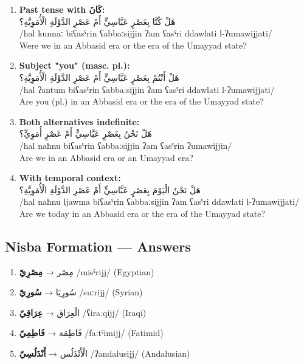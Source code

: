 \documentclass[letterpaper,12pt]{article}
\begin{document}
\begin{enumerate}
\item \textbf{Past tense with \textarabic{كَانَ}:}\\
\textarabic{هَلْ كُنَّا بِعَصْرٍ عَبَّاسِيٍّ أَمْ عَصْرِ الدَّوْلَةِ الْأُمَوِيَّةِ؟}\\
/hal kunnaː biʕasˤrin ʕabbaːsijjin ʔam ʕasˤri ddawlati l-ʔumawijjati/\\
Were we in an Abbasid era or the era of the Umayyad state?

\item \textbf{Subject "you" (masc. pl.):}\\
\textarabic{هَلْ أَنْتُمْ بِعَصْرٍ عَبَّاسِيٍّ أَمْ عَصْرِ الدَّوْلَةِ الْأُمَوِيَّةِ؟}\\
/hal ʔantum biʕasˤrin ʕabbaːsijjin ʔam ʕasˤri ddawlati l-ʔumawijjati/\\
Are you (pl.) in an Abbasid era or the era of the Umayyad state?

\item \textbf{Both alternatives indefinite:}\\
\textarabic{هَلْ نَحْنُ بِعَصْرٍ عَبَّاسِيٍّ أَمْ عَصْرٍ أُمَوِيٍّ؟}\\
/hal naħnu biʕasˤrin ʕabbaːsijjin ʔam ʕasˤrin ʔumawijjin/\\
Are we in an Abbasid era or an Umayyad era?

\item \textbf{With temporal context:}\\
\textarabic{هَلْ نَحْنُ الْيَوْمَ بِعَصْرٍ عَبَّاسِيٍّ أَمْ عَصْرِ الدَّوْلَةِ الْأُمَوِيَّةِ؟}\\
/hal naħnu ljawma biʕasˤrin ʕabbaːsijjin ʔam ʕasˤri ddawlati l-ʔumawijjati/\\
Are we today in an Abbasid era or the era of the Umayyad state?
\end{enumerate}

\subsection{Nisba Formation — Answers}

\begin{enumerate}
\item \textarabic{مِصْر} → \textbf{\textarabic{مِصْرِيّ}} /misˤrijj/ (Egyptian)

\item \textarabic{سُورِيَا} → \textbf{\textarabic{سُورِيّ}} /suːrijj/ (Syrian)

\item \textarabic{الْعِرَاق} → \textbf{\textarabic{عِرَاقِيّ}} /ʕiraːqijj/ (Iraqi)

\item \textarabic{فَاطِمَة} → \textbf{\textarabic{فَاطِمِيّ}} /faːtˤimijj/ (Fatimid)

\item \textarabic{الْأَنْدَلُس} → \textbf{\textarabic{أَنْدَلُسِيّ}} /ʔandalusijj/ (Andalusian)
\end{enumerate}
\end{document}
